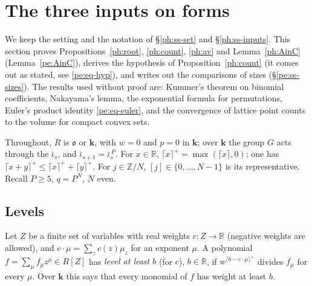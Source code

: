 \documentclass[10pt]{amsart}
\theoremstyle{definition}
\theoremstyle{remark}
\newcommand{\R}{\mathbb R}
\newcommand{\Z}{\mathbb Z}
\providecommand{\auF}{\mathbb F}
\providecommand{\auGL}{\mathrm{GL}}
\providecommand{\aucol}{\operatorname{col}}
\providecommand{\pam}{\mathfrak m}
\providecommand{\pao}{\mathfrak o}
\providecommand{\phA}{\mathfrak A}
\providecommand{\phB}{\mathfrak B}
\providecommand{\phcd}{c_{\mathrm{div}}}
\providecommand{\phdef}{\operatorname{def}}
\providecommand{\phdep}{\operatorname{dp}}
\providecommand{\phk}{\boldsymbol k}
\begin{document}
\providecommand{\auGL}{\mathrm{GL}}
\providecommand{\auF}{\mathbb F}
\providecommand{\aucol}{\operatorname{col}}
\providecommand{\pao}{\mathfrak o}
\providecommand{\pam}{\mathfrak m}
\providecommand{\phB}{\mathfrak B}
\providecommand{\phA}{\mathfrak A}
\providecommand{\phk}{\boldsymbol k}
\providecommand{\phdep}{\operatorname{dp}}
\providecommand{\phdef}{\operatorname{def}}
\providecommand{\phcd}{c_{\mathrm{div}}}
\providecommand{\peX}{\mathbf X}
\providecommand{\peG}{\mathbf G}
\providecommand{\peS}{\mathbf S}
\providecommand{\peht}{\operatorname{ht}}
\providecommand{\perw}{\operatorname{rw}}
\providecommand{\pecw}{\operatorname{cw}}
\providecommand{\pevol}{\operatorname{vol}}
\providecommand{\petr}{\operatorname{tr}}
\providecommand{\pesgn}{\operatorname{sgn}}
\providecommand{\peC}{\mathcal C}
\providecommand{\pecl}[1]{\lceil #1\rceil^{+}}
\providecommand{\pesh}{\sharp}

\section{The three inputs on forms}\label{pe:sec}

We keep the setting and the notation of \S\ref{ph:ss-set} and \S\ref{ph:ss-inputs}. This section
proves Propositions~\ref{ph:root}, \ref{ph:count}, \ref{ph:av} and
Lemma~\ref{ph:AinC} (Lemma~\ref{pe:AinC}), derives the hypothesis of Proposition~\ref{ph:count} (it comes
out as stated, see \eqref{pe:eq-hyp}), and writes out the comparisons of sizes
(\S\ref{pe:ss-sizes}). The results used without proof are: Kummer's theorem on binomial
coefficients, Nakayama's lemma, the exponential formula for permutations, Euler's product identity
\eqref{pe:eq-euler}, and the convergence of lattice point counts to the volume for compact convex
sets.

Throughout, $R$ is $\pao$ or $\phk$, with $w=0$ and $p=0$ in $\phk$; over $\phk$ the group
$G$ acts through the $\bar\iota_s$, and $\bar\iota_{s+1}=\bar\iota_s^{\,P}$. For $x\in\R$,
$\pecl x=\max(\lceil x\rceil,0)$; one has $\pecl{x+y}\le\pecl x+\pecl y$. For $j\in\Z/N$, $[j]\in
\{0,\dots,N-1\}$ is its representative. Recall $P\ge5$, $q=P^N$, $N$ even.

\subsection{Levels}\label{pe:ss-lev}
Let $Z$ be a finite set of variables with real weights $c\colon Z\to\R$ (negative weights are
allowed), and $c\cdot\mu=\sum_zc(z)\mu_z$ for an exponent $\mu$. A polynomial $f=\sum_\mu f_\mu
z^\mu\in R[Z]$ has \emph{level at least $b$} (for $c$), $b\in\R$, if $w^{\pecl{b-c\cdot\mu}}$
divides $f_\mu$ for every $\mu$. Over $\phk$ this says that every monomial of $f$ has weight at
least $b$.
\end{document}
